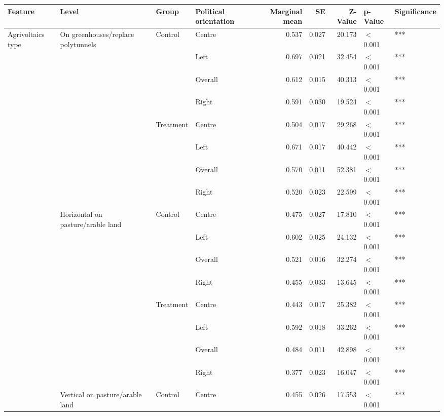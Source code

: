 
\begin{longtable}[t]{>{\raggedright\arraybackslash}t{3cm}>{\raggedright\arraybackslash}t{3cm}>{\raggedright\arraybackslash}t{2.5cm}lrrrll}
\toprule
Feature & Level & Group & Political orientation & Marginal mean & SE & Z-Value & p-Value & Significance\\
\midrule
Agrivoltaics type & On greenhouses/replace polytunnels & Control & Centre & 0.537 & 0.027 & 20.173 & $<$0.001 & ***\\
\nopagebreak
 &  &  & Left & 0.697 & 0.021 & 32.454 & $<$0.001 & ***\\
\nopagebreak
 &  &  & Overall & 0.612 & 0.015 & 40.313 & $<$0.001 & ***\\
\nopagebreak
 &  &  & Right & 0.591 & 0.030 & 19.524 & $<$0.001 & ***\\
\nopagebreak
 &  & Treatment & Centre & 0.504 & 0.017 & 29.268 & $<$0.001 & ***\\
\nopagebreak
 &  &  & Left & 0.671 & 0.017 & 40.442 & $<$0.001 & ***\\
\nopagebreak
 &  &  & Overall & 0.570 & 0.011 & 52.381 & $<$0.001 & ***\\
\nopagebreak
 &  &  & Right & 0.520 & 0.023 & 22.599 & $<$0.001 & ***\\
\nopagebreak
 & Horizontal on pasture/arable land & Control & Centre & 0.475 & 0.027 & 17.810 & $<$0.001 & ***\\
\nopagebreak
 &  &  & Left & 0.602 & 0.025 & 24.132 & $<$0.001 & ***\\
\nopagebreak
 &  &  & Overall & 0.521 & 0.016 & 32.274 & $<$0.001 & ***\\
\nopagebreak
 &  &  & Right & 0.455 & 0.033 & 13.645 & $<$0.001 & ***\\
\nopagebreak
 &  & Treatment & Centre & 0.443 & 0.017 & 25.382 & $<$0.001 & ***\\
\nopagebreak
 &  &  & Left & 0.592 & 0.018 & 33.262 & $<$0.001 & ***\\
\nopagebreak
 &  &  & Overall & 0.484 & 0.011 & 42.898 & $<$0.001 & ***\\
\nopagebreak
 &  &  & Right & 0.377 & 0.023 & 16.047 & $<$0.001 & ***\\
\nopagebreak
 & Vertical on pasture/arable land & Control & Centre & 0.455 & 0.026 & 17.553 & $<$0.001 & ***\\

\end{longtable}
